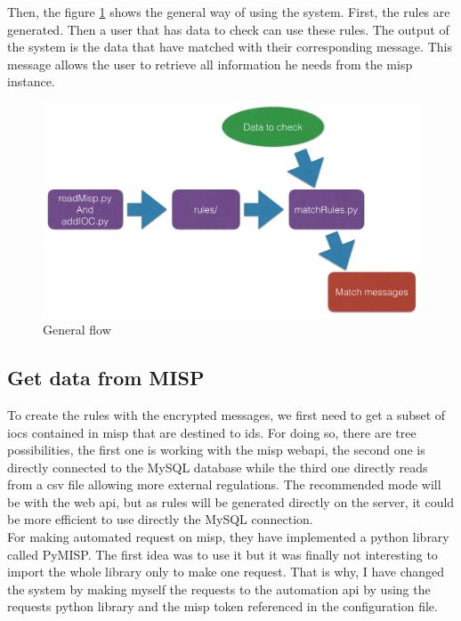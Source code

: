 \documentclass{eplmastersthesis}
\begin{document}
Then, the figure \ref{general-flow} shows the general way of using the system. First, the rules are generated. Then a user that has data to check can use these rules. The output of the system is the data that have matched with their corresponding message. This message allows the user to retrieve all information he needs from the \gls{misp} instance.\\

\begin{figure}
\centering
\includegraphics[scale=0.4]{res/generalFlow}
\caption{General flow}
\label{general-flow}
\end{figure}

\subsection{Get data from MISP}
To create the rules with the encrypted messages, we first need to get a subset of \gls{ioc}s contained in \gls{misp} that are destined to \gls{ids}. 
For doing so, there are tree possibilities, the first one is working with the \gls{misp} web\gls{api}, the second one is directly connected to the MySQL database while the third one directly reads from a \gls{csv} file allowing more external regulations.
The recommended mode will be with the web \gls{api}, but as rules will be generated directly on the server, it could be more efficient to use directly the MySQL connection.\\

For making automated request on \gls{misp}, they have implemented a python library called PyMISP. The first idea was to use it but it was finally not interesting to import the whole library only to make one request. That is why, I have changed the system by making myself the requests to the automation \gls{api} by using the requests python library and the \gls{misp} token referenced in the configuration file.\\
\end{document}
